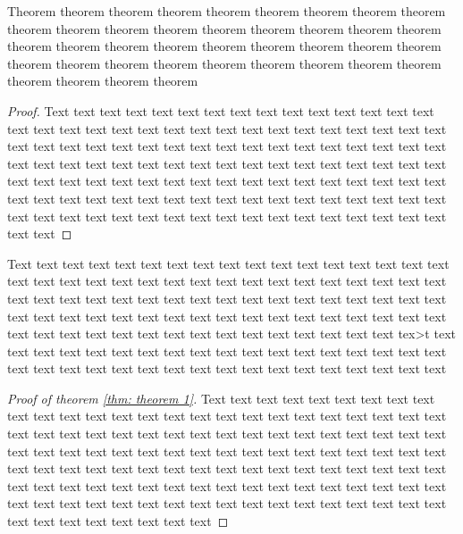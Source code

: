 \documentclass{Thesis}
\begin{document}
\begin{theorem}\label{thm: theorem 1}
  Theorem theorem  theorem theorem theorem theorem theorem theorem theorem theorem theorem theorem theorem theorem theorem theorem theorem theorem theorem theorem theorem theorem theorem theorem theorem theorem theorem theorem theorem theorem theorem theorem theorem theorem theorem theorem theorem theorem theorem theorem
\end{theorem}

\begin{proof}
  Text text text text text text text text text text text text text text text text text text text text text text text text text text text text text text text text text text text text text text text text text text text text text text text text text text text text text text text text text text text text text text text text text text text text text text text text text text text text text text text text text text text text text text text text text text text text text text text text text text text text text text text text text text text text text text text text text text text text text text text
\end{proof}

Text text text text text text text text text text text text text text text text text text text text text text text text text text text text text text text text text text text text text text text text text text text text text text text text text text text text text text text text text text text text text text text text text text text text text text text text text text text text text text text text text text text tex>t text text text text text text text text text text text text text text text text text text text text text text text text text text text text text text text text text text text

\begin{proof}[Proof of theorem \ref{thm: theorem 1}]
  Text text text text text text text text text text text text text text text text text text text text text text text text text text text text text text text text text text text text text text text text text text text text text text text text text text text text text text text text text text text text text text text text text text text text text text text text text text text text text text text text text text text text text text text text text text text text text text text text text text text text text text text text text text text text text text text text text text text text text text text
\end{proof}
\end{document}
